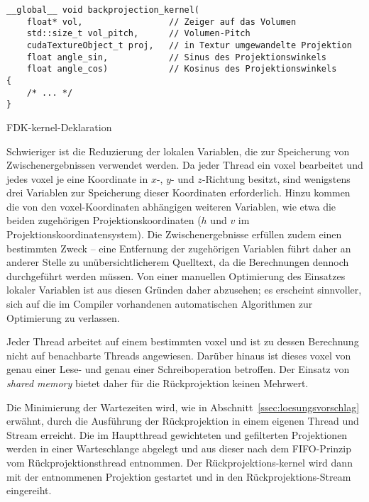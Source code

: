 \begin{code}
\begin{verbatim}
__global__ void backprojection_kernel(
    float* vol,                 // Zeiger auf das Volumen
    std::size_t vol_pitch,      // Volumen-Pitch
    cudaTextureObject_t proj,   // in Textur umgewandelte Projektion
    float angle_sin,            // Sinus des Projektionswinkels
    float angle_cos)            // Kosinus des Projektionswinkels
{
    /* ... */
}
\end{verbatim}
\caption{FDK-\gls{kernel}-Deklaration}
\label{source:fdk_kernel_param}
\end{code}

Schwieriger ist die Reduzierung der lokalen Variablen, die zur Speicherung von Zwischenergebnissen verwendet werden. Da
jeder Thread ein \gls{voxel} bearbeitet und jedes \gls{voxel} je eine Koordinate in $x$-, $y$- und $z$-Richtung besitzt,
sind wenigstens drei Variablen zur Speicherung dieser Koordinaten erforderlich. Hinzu kommen die von den
\gls{voxel}-Koordinaten abhängigen weiteren Variablen, wie etwa die beiden zugehörigen Projektionskoordinaten ($h$ und
$v$ im Projektionskoordinatensystem). Die Zwischenergebnisse erfüllen zudem einen bestimmten Zweck -- eine Entfernung
der zugehörigen Variablen führt daher an anderer Stelle zu unübersichtlicherem Quelltext, da die Berechnungen dennoch
durchgeführt werden müssen. Von einer manuellen Optimierung des Einsatzes lokaler Variablen ist aus diesen Gründen daher
abzusehen; es erscheint sinnvoller, sich auf die im Compiler vorhandenen automatischen Algorithmen zur Optimierung zu
verlassen.

Jeder Thread arbeitet auf einem bestimmten \gls{voxel} und ist zu dessen Berechnung nicht auf benachbarte Threads
angewiesen. Darüber hinaus ist dieses \gls{voxel} von genau einer Lese- und genau einer Schreiboperation betroffen. Der
Einsatz von \textit{shared memory} bietet daher für die Rückprojektion keinen Mehrwert.

Die Minimierung der Wartezeiten wird, wie in Abschnitt~\ref{ssec:loesungsvorschlag} erwähnt, durch die Ausführung der
Rückprojektion in einem eigenen Thread und Stream erreicht. Die im Hauptthread gewichteten und gefilterten Projektionen
werden in einer Warteschlange abgelegt und aus dieser nach dem FIFO-Prinzip vom Rückprojektionsthread entnommen. Der
Rückprojektions-\gls{kernel} wird dann mit der entnommenen Projektion gestartet und in den Rückprojektions-Stream
eingereiht.

